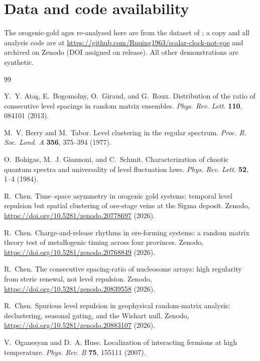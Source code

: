 \documentclass[11pt]{article}
\begin{document}
\section*{Data and code availability}
The orogenic-gold ages re-analysed here are from the dataset of
\citet{chen2026metallogeny}; a copy and all analysis code are at
\url{https://github.com/Ruqing1963/scalar-clock-not-goe} and archived on Zenodo
(DOI assigned on release). All other demonstrations are synthetic.

\begin{thebibliography}{99}

Y.~Y. Ata\c{s}, E.~Bogomolny, O.~Giraud, and G.~Roux.
Distribution of the ratio of consecutive level spacings in random matrix
ensembles. \textit{Phys. Rev. Lett.} \textbf{110}, 084101 (2013).

M.~V. Berry and M.~Tabor.
Level clustering in the regular spectrum.
\textit{Proc. R. Soc. Lond. A} \textbf{356}, 375--394 (1977).

O.~Bohigas, M.~J. Giannoni, and C.~Schmit.
Characterization of chaotic quantum spectra and universality of level fluctuation
laws. \textit{Phys. Rev. Lett.} \textbf{52}, 1--4 (1984).

R.~Chen.
Time--space asymmetry in orogenic gold systems: temporal level repulsion but
spatial clustering of ore-stage veins at the Sigma deposit. Zenodo,
\url{https://doi.org/10.5281/zenodo.20778697} (2026).

R.~Chen.
Charge-and-release rhythms in ore-forming systems: a random matrix theory test of
metallogenic timing across four provinces. Zenodo,
\url{https://doi.org/10.5281/zenodo.20768849} (2026).

R.~Chen.
The consecutive spacing-ratio of nucleosome arrays: high regularity from steric
renewal, not level repulsion. Zenodo,
\url{https://doi.org/10.5281/zenodo.20839558} (2026).

R.~Chen.
Spurious level repulsion in geophysical random-matrix analysis: declustering,
seasonal gating, and the Wishart null. Zenodo,
\url{https://doi.org/10.5281/zenodo.20883107} (2026).

V.~Oganesyan and D.~A. Huse.
Localization of interacting fermions at high temperature.
\textit{Phys. Rev. B} \textbf{75}, 155111 (2007).

\end{thebibliography}
\end{document}
